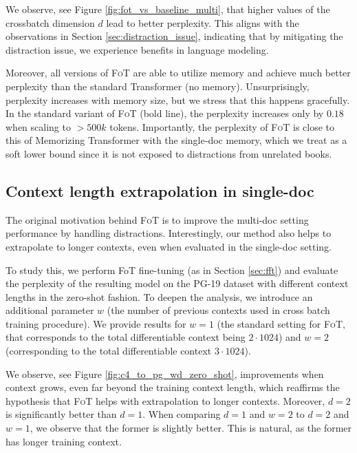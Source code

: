 We observe, see Figure \ref{fig:fot_vs_baseline_multi}, that higher values of the crossbatch dimension $d$ lead to better perplexity. This aligns with the observations in Section \ref{sec:distraction_issue}, indicating that by mitigating the distraction issue, we experience benefits in language modeling.

Moreover, all versions of \textsc{FoT} are able to utilize memory and achieve much better perplexity than the standard Transformer (no memory). Unsurprisingly, perplexity increases with memory size, but we stress that this happens gracefully. In the standard variant of \textsc{FoT} (bold line), the perplexity increases only by $0.18$ when scaling to $>500k$ tokens. Importantly, the perplexity of \textsc{FoT} is close to this of Memorizing Transformer with the single-doc memory, which we treat as a soft lower bound since it is not exposed to distractions from unrelated books.

\subsection{Context length extrapolation in single-doc}\label{sec:extrapolation}

The {original} motivation behind \textsc{FoT} is to improve the multi-doc setting performance by handling distractions. Interestingly, our method also helps to extrapolate to longer contexts, even when evaluated in the single-doc setting.

To study this, we perform FoT fine-tuning (as in Section \ref{sec:fft}) and evaluate the perplexity of the resulting model on the PG-19 dataset with different context lengths in the zero-shot fashion. To deepen the analysis, we introduce an additional parameter $w$ (the number of previous contexts used in cross batch training procedure). We provide results for $w=1$ (the standard  setting for \textsc{FoT}, that corresponds to the total differentiable context being $2\cdot1024$)
and $w=2$ (corresponding to the total differentiable context  $3\cdot1024$).

We observe, see Figure \ref{fig:c4_to_pg_wd_zero_shot}, improvements when context grows, even far beyond the training context length, which reaffirms the hypothesis that \textsc{FoT} helps with extrapolation to longer contexts. Moreover, $d=2$ is significantly better than $d=1$. When comparing $d=1$ and $w=2$ to $d=2$ and $w=1$, we observe that the former is slightly better. This is natural, as the former has longer training context.

